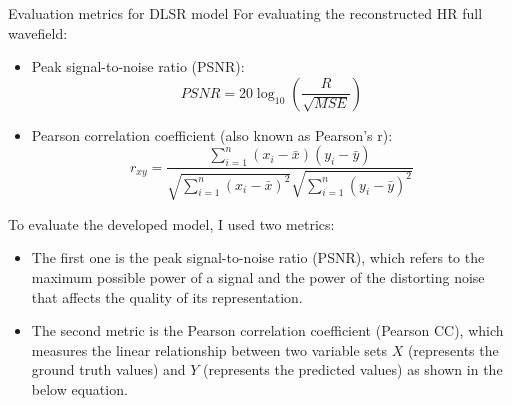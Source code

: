 \documentclass[10pt,aspectratio=169,dvipsnames]{beamer} %
\begin{document}
	\setcounter{subfigure}{0}
	\begin{frame}{Evaluation metrics for DLSR model}
		For evaluating the reconstructed HR full wavefield:
		\begin{itemize}
			\item Peak signal-to-noise ratio (PSNR):
			\begin{equation*}
				PSNR=20\log_{10}\left(\frac{R}{\sqrt{MSE}}\right)
				\label{PSNR_}
			\end{equation*}			
			\item Pearson correlation coefficient (also known as Pearson's r):
			\begin{equation*}
				r_{xy} = \frac{\sum_{i=1}^{n}(x_i - \bar{x})(y_i-\bar{y})}{\sqrt{\sum_{i=1}^{n}(x_i - \bar{x})^2}\sqrt{\sum_{i=1}^{n}(y_i - \bar{y})^2}}
				\label{Pearson_}
			\end{equation*}
		\end{itemize}
	\end{frame}
	\note
	{
		To evaluate the developed model, I used two metrics:
		\begin{itemize}
			\item The first one is the peak signal-to-noise ratio (PSNR), which refers to the maximum possible power of a signal and the power of the distorting noise that affects the quality of its representation.
%			
			\item The second metric is the Pearson correlation coefficient (Pearson CC), which measures the linear relationship between two
			variable sets \(X\) (represents the ground truth values) and \(Y\) (represents the predicted values) as shown in the below equation.
			
		\end{itemize}
	}
	\setcounter{subfigure}{0}
\end{document}
